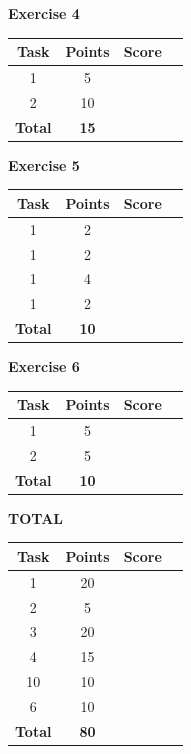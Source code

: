 \documentclass [11pt, a4wide, twoside]{article}
\begin{document}
\begin{minipage}[t]{120pt}


\textbf{Exercise 4}
\vspace{5pt}\\
\begin{tabular}{|c|c|c|c|}
\hline
Task & Points & Score \\\hline
1 & 5 & \\\hline
2 & 10 & \\\hline
\textbf{Total} & \textbf{15} &\\\hline\hline
\end{tabular}
\end{minipage}

\noindent
\begin{minipage}[t]{120pt}

\vspace{1cm}

\textbf{Exercise 5}
\vspace{5pt}\\
\begin{tabular}{|c|c|c|c|}
\hline
Task & Points & Score \\\hline
1 & 2 & \\\hline
1 & 2 & \\\hline
1 & 4 & \\\hline
1 & 2 & \\\hline
\textbf{Total} & \textbf{10} &\\\hline\hline
\end{tabular}
\end{minipage}
\begin{minipage}[t]{120pt}
\vspace{1cm}

\textbf{Exercise 6}
\vspace{5pt}\\
\begin{tabular}{|c|c|c|c|}
\hline
Task & Points & Score \\\hline
1 & 5 & \\\hline
2 & 5 & \\\hline
\textbf{Total} & \textbf{10} &\\\hline\hline
\end{tabular}
\vspace{5cm}

\textbf{TOTAL}
\vspace{5pt}\\
\begin{tabular}{|c|c|c|c|}
\hline
Task & Points & Score \\\hline
1 & 20 & \\\hline
2 & 5 & \\\hline
3 & 20 & \\\hline
4 & 15 & \\\hline
10 & 10 & \\\hline
6 & 10 & \\\hline
\textbf{Total} & \textbf{80} &\\\hline\hline
\end{tabular}
\end{minipage}
\end{document}

